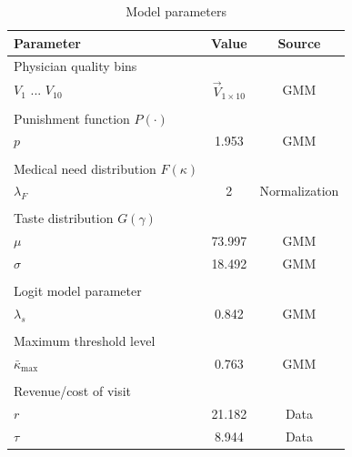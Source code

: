 \documentclass[../main.tex]{subfiles}
\begin{document}
\begin{table}[H]
    \centering
    \small
    \begin{tabular}{lcc}
        \toprule
        Parameter  & Value & Source \\
        \midrule
        Physician quality bins && \\
        \hspace{1em}$V_1$ ... $V_{10}$ & $\vec{V}_{1 \times 10}$ & GMM \\
            \\
        Punishment function $P(\cdot)$ && \\
            \hspace{1em}$p$ & 1.953 &  GMM\\
            \\
        Medical need distribution $F(\kappa)$ && \\
            \hspace{1em}$\lambda_F$ & 2 & \hspace{0.25em} Normalization\\
            \\
        Taste distribution $G(\gamma)$ \\
            \hspace{1em}$\mu$ & 73.997 &  GMM\\
            \hspace{1em}$\sigma$ & 18.492 &  GMM\\
            \\
        Logit model parameter && \\
            \hspace{1em}$\lambda_s$ & 0.842 & GMM\\
            \\
        Maximum threshold level && \\
            \hspace{1em}$\bar{\kappa}_{\max}$ & 0.763 &  GMM\\
            \\
        Revenue/cost of visit && \\
            \hspace{1em}$r$ & 21.182 & Data \\
            \hspace{1em}$\tau$ & 8.944 & Data \\
        \bottomrule 
    \end{tabular}
    \caption{Model parameters}
    \label{tab:gmm}
\end{table}
\end{document}
